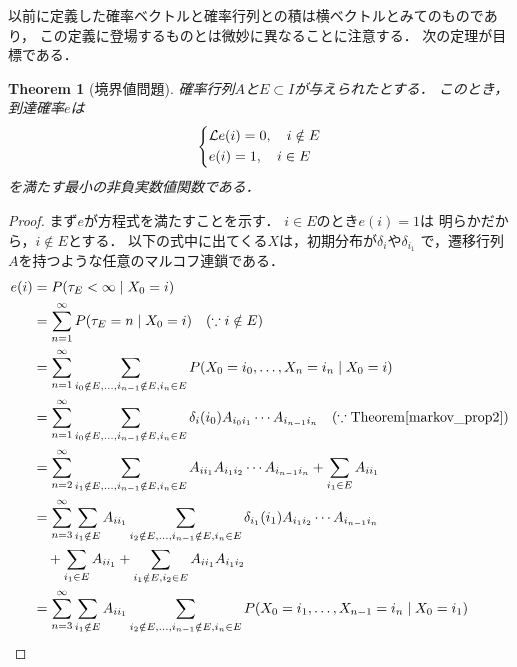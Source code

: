 \documentclass[dvipdfmx,autodetect-engine]{jsarticle}
\newtheorem{theorem}{Theorem}[section]
\theoremstyle{remark}
\theoremstyle{definition}
\begin{document}
以前に定義した確率ベクトルと確率行列との積は横ベクトルとみてのものであり，
この定義に登場するものとは微妙に異なることに注意する．
次の定理が目標である．


\begin{theorem}[境界値問題]
    確率行列$A$と$E \subset I$が与えられたとする．
    このとき，到達確率$e$は
    \begin{align}
        \begin{dcases}
            \mathcal{L}e(i) = 0, \quad i \notin E \\
            e(i) = 1, \quad i \in E 
        \end{dcases}
    \end{align}
    を満たす最小の非負実数値関数である．
\end{theorem}

\begin{proof}
    まず$e$が方程式を満たすことを示す．
    $i \in E$のとき$e(i)=1$は
    明らかだから，$i \notin E$とする．
    以下の式中に出てくる$X$は，初期分布が$\delta_{i}$や$\delta_{i_1}$
    で，遷移行列$A$を持つような任意のマルコフ連鎖である．
    \begin{align}
        e(i) &= P(\tau_{E}<\infty \mid X_0 = i) \\
        &= \sum_{n=1}^{\infty} P(\tau_{E} = n \mid X_0 = i) \quad (\because i \notin E)\\
        &= \sum_{n=1}^{\infty} \sum_{i_0 \notin E,\ldots,i_{n-1}\notin E,i_n\in E} 
        P(X_0 = i_0,\ldots,X_n = i_n \mid X_0 = i) \\
        &= \sum_{n=1}^{\infty} \sum_{i_0 \notin E,\ldots,i_{n-1}\notin E,i_n\in E} 
        \delta_{i}(i_0)  A_{i_0 i_1}\cdots A_{i_{n-1} i_n} \quad 
        (\because \mathrm{Theorem}\ref{markov_prop2})\\
        &= \sum_{n=2}^{\infty} \sum_{i_1 \notin E,\ldots,i_{n-1}\notin E,i_n\in E} 
         A_{i i_1} A_{i_1 i_2}\cdots A_{i_{n-1} i_n} 
         + \sum_{i_{1} \in E} A_{i i_{1}} \\
        &= \sum_{n=3}^{\infty} \sum_{i_{1} \notin E} A_{i i_{1}} 
        \sum_{i_2 \notin E,\ldots,i_{n-1}\notin E,i_n\in E} 
        \delta_{i_1}(i_1) A_{i_1 i_2}\cdots A_{i_{n-1} i_n} \\
        &\quad + \sum_{i_{1} \in E} A_{i i_{1}} 
        + \sum_{i_{1} \notin E,i_{2} \in E} A_{i i_{1}} A_{i_{1} i_{2}}\\
        &= \sum_{n=3}^{\infty} \sum_{i_{1} \notin E} A_{i i_{1}}
        \sum_{i_2 \notin E,\ldots,i_{n-1}\notin E,i_n\in E} 
        P(X_0 = i_1,\ldots,X_{n-1} = i_n \mid X_0 = i_1) 

\end{align}
\end{proof}
\end{document}
